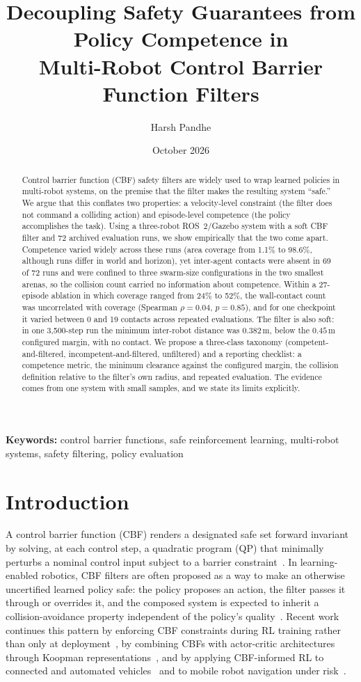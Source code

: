 \documentclass[12pt]{article}
\title{Decoupling Safety Guarantees from Policy Competence in\\
Multi-Robot Control Barrier Function Filters}
\author[1]{Harsh Pandhe}
\affil[1]{Independent Research \\ \texttt{harshpandhehome@gmail.com}}
\date{October 2026}
\newcommand{\si}[1]{\mathrm{#1}}
\begin{document}
\maketitle

\begin{abstract}
\noindent
Control barrier function (CBF) safety filters are widely used to wrap
learned policies in multi-robot systems, on the premise that the filter
makes the resulting system ``safe.'' We argue that this conflates two
properties: a velocity-level constraint (the filter does not command a
colliding action) and episode-level competence (the policy accomplishes the
task). Using a three-robot ROS~2/Gazebo system with a soft CBF filter and
72 archived evaluation runs, we show empirically that the two come apart.
Competence varied widely across these runs (area coverage from 1.1\% to
98.6\%, although runs differ in world and horizon), yet inter-agent contacts were absent in 69 of 72 runs and were
confined to three swarm-size configurations in the two smallest arenas, so
the collision count carried no information about competence. Within a
27-episode ablation in which coverage ranged from 24\% to 52\%, the
wall-contact count was uncorrelated with coverage (Spearman $\rho=0.04$,
$p=0.85$), and for one checkpoint it varied between 0 and 19 contacts
across repeated evaluations. The filter is also soft: in one 3,500-step run
the minimum inter-robot distance was $0.382\,\si{m}$, below the $0.45\,\si{m}$
configured margin, with no contact. We propose a three-class taxonomy
(competent-and-filtered, incompetent-and-filtered, unfiltered) and a
reporting checklist: a competence metric, the minimum clearance against the
configured margin, the collision definition relative to the filter's own
radius, and repeated evaluation. The evidence comes from one system with
small samples, and we state its limits explicitly.
\end{abstract}

\noindent\textbf{Keywords:} control barrier functions, safe reinforcement
learning, multi-robot systems, safety filtering, policy evaluation

\section{Introduction}
A control barrier function (CBF) renders a designated safe set forward
invariant by solving, at each control step, a quadratic program (QP) that
minimally perturbs a nominal control input subject to a barrier
constraint~\cite{ames2019cbf}. In learning-enabled robotics, CBF filters are
often proposed as a way to make an otherwise uncertified learned policy
safe: the policy proposes an action, the filter passes it through or
overrides it, and the composed system is expected to inherit a
collision-avoidance property independent of the policy's
quality~\cite{cheng2019end}. Recent work continues this pattern by enforcing
CBF constraints during RL training rather than only at
deployment~\cite{cbfrl2025}, by combining CBFs with actor-critic
architectures through Koopman representations~\cite{koopmancbf2026}, and by
applying CBF-informed RL to connected and automated
vehicles~\cite{beyondsafety2026} and to mobile robot navigation under
risk~\cite{riskaware2026}.
\end{document}
